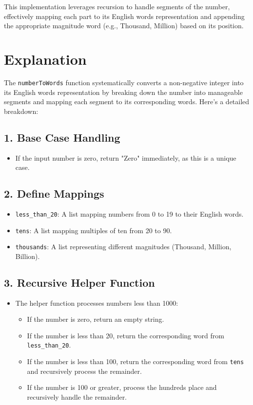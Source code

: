 This implementation leverages recursion to handle segments of the number, effectively mapping each part to its English words representation and appending the appropriate magnitude word (e.g., Thousand, Million) based on its position.

\section*{Explanation}

The \texttt{numberToWords} function systematically converts a non-negative integer into its English words representation by breaking down the number into manageable segments and mapping each segment to its corresponding words. Here's a detailed breakdown:

\subsection*{1. Base Case Handling}

\begin{itemize}
    \item If the input number is zero, return "Zero" immediately, as this is a unique case.
\end{itemize}

\subsection*{2. Define Mappings}

\begin{itemize}
    \item \texttt{less\_than\_20}: A list mapping numbers from 0 to 19 to their English words.
    \item \texttt{tens}: A list mapping multiples of ten from 20 to 90.
    \item \texttt{thousands}: A list representing different magnitudes (Thousand, Million, Billion).
\end{itemize}

\subsection*{3. Recursive Helper Function}

\begin{itemize}
    \item The helper function processes numbers less than 1000:
    \begin{itemize}
        \item If the number is zero, return an empty string.
        \item If the number is less than 20, return the corresponding word from \texttt{less\_than\_20}.
        \item If the number is less than 100, return the corresponding word from \texttt{tens} and recursively process the remainder.
        \item If the number is 100 or greater, process the hundreds place and recursively handle the remainder.
    \end{itemize}
\end{itemize}

